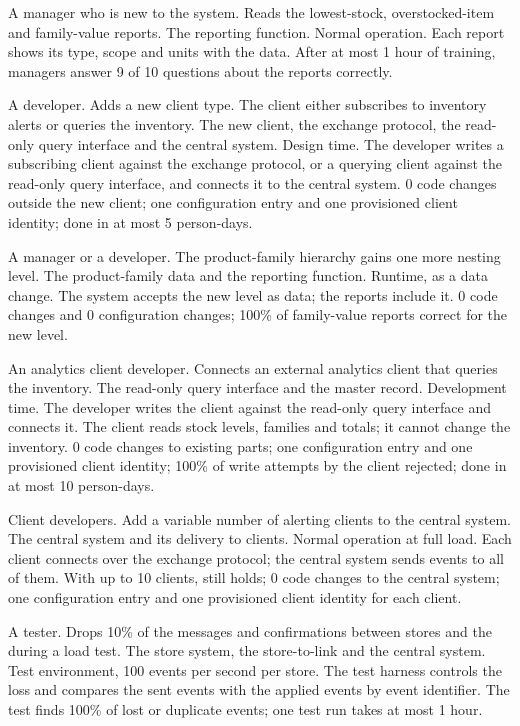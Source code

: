   {A \DC manager who is new to the system.}
  {Reads the lowest-stock, overstocked-item and family-value reports.}
  {The reporting function.}
  {Normal operation.}
  {Each report shows its type, scope and units with the data.}
  {After at most 1 hour of training, managers answer 9 of 10 questions about the reports correctly.}

  {A developer.}
  {Adds a new client type. The client either subscribes to inventory alerts or queries the inventory.}
  {The new client, the exchange protocol, the read-only query interface and the central system.}
  {Design time.}
  {The developer writes a subscribing client against the exchange protocol, or a querying client against the read-only query interface, and connects it to the central system.}
  {0 code changes outside the new client; one configuration entry and one provisioned client identity; done in at most 5 person-days.}

  {A \DC manager or a developer.}
  {The product-family hierarchy gains one more nesting level.}
  {The product-family data and the reporting function.}
  {Runtime, as a data change.}
  {The system accepts the new level as data; the reports include it.}
  {0 code changes and 0 configuration changes; 100\% of family-value reports correct for the new level.}

  {An analytics client developer.}
  {Connects an external analytics client that queries the inventory.}
  {The read-only query interface and the master record.}
  {Development time.}
  {The developer writes the client against the read-only query interface and connects it. The client reads stock levels, families and totals; it cannot change the inventory.}
  {0 code changes to existing parts; one configuration entry and one provisioned client identity; 100\% of write attempts by the client rejected; done in at most 10 person-days.}

  {Client developers.}
  {Add a variable number of alerting clients to the central system.}
  {The central system and its delivery to clients.}
  {Normal operation at full load.}
  {Each client connects over the exchange protocol; the central system sends events to all of them.}
  {With up to 10 clients,  still holds; 0 code changes to the central system; one configuration entry and one provisioned client identity for each client.}

  {A tester.}
  {Drops 10\% of the messages and confirmations between stores and the \DC during a load test.}
  {The store system, the store-to-\DC link and the central system.}
  {Test environment, 100 events per second per store.}
  {The test harness controls the loss and compares the sent events with the applied events by event identifier.}
  {The test finds 100\% of lost or duplicate events; one test run takes at most 1 hour.}

